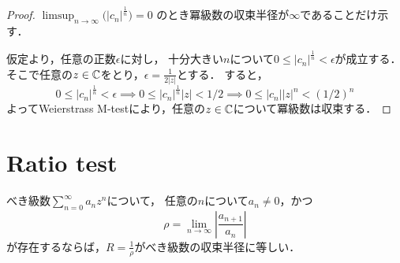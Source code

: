 \documentclass[a4paper]{jsarticle}
\begin{document}
        \begin{proof}
            $\limsup_{n \to \infty} \big( | c_{n} |^\frac{1}{n} \big)=0$
            のとき冪級数の収束半径が$\infty$であることだけ示す．

            仮定より，任意の正数$\epsilon$に対し，
            十分大きい$n$について$0 \leq | c_{n} |^\frac{1}{n} < \epsilon$が成立する．
            そこで任意の$z \in \mathbb{C}$をとり，$\epsilon=\frac{1}{2|z|}$とする．
            すると，
            \[
                0 \leq | c_{n} |^\frac{1}{n} < \epsilon
                \implies
                0 \leq | c_{n} |^\frac{1}{n}|z| < 1/2
                \implies
                0 \leq | c_{n} ||z|^{n} < (1/2)^n
            \]
            よってWeierstrass M-testにより，任意の$z \in \mathbb{C}$について冪級数は収束する．
        \end{proof}

    \section{Ratio test}
        \begin{Thm}
        べき級数$\sum_{n=0}^\infty{a_n}z^n$について，
        任意の$n$について$a_n \neq 0$，かつ
        \[
            \rho = \lim_{n \to \infty} \left| \frac{a_{n+1}}{a_n} \right|
        \]
        が存在するならば，$R=\frac{1}{\rho}$がべき級数の収束半径に等しい．
        \end{Thm}
\end{document}
